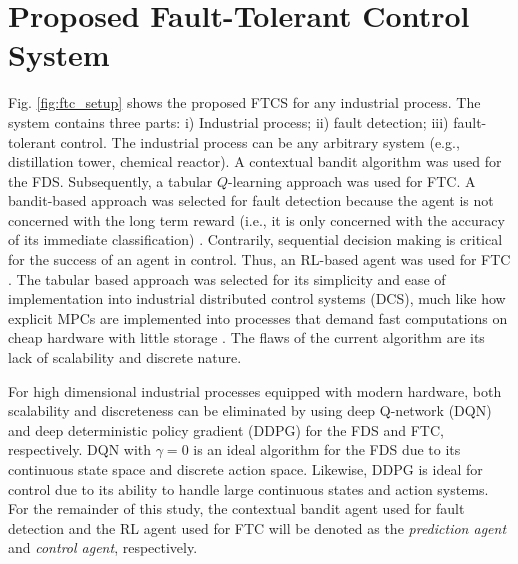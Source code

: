 \section{Proposed Fault-Tolerant Control System}

Fig. \ref{fig:ftc_setup} shows the proposed FTCS for any industrial process. The system contains three parts: i) Industrial process; ii) fault detection; iii) fault-tolerant control. The industrial process can be any arbitrary system (e.g., distillation tower, chemical reactor). A contextual bandit algorithm was used for the FDS. Subsequently, a tabular $Q$-learning approach was used for FTC. A bandit-based approach was selected for fault detection because the agent is not concerned with the long term reward (i.e., it is only concerned with the accuracy of its immediate classification) \cite{sutton}.  Contrarily, sequential decision making is critical for the success of an agent in control.  Thus, an RL-based agent was used for FTC \cite{bandits_ref9}. The tabular based approach was selected for its simplicity and ease of implementation into industrial distributed control systems (DCS), much like how explicit MPCs are implemented into processes that demand fast computations on cheap hardware with little storage \cite{explicit_MPC}. The flaws of the current algorithm are its lack of scalability and discrete nature.

For high dimensional industrial processes equipped with modern hardware, both scalability and discreteness can be eliminated by using deep Q-network (DQN) and deep deterministic policy gradient (DDPG) for the FDS and FTC, respectively.  DQN with $\gamma = 0$ is an ideal algorithm for the FDS due to its continuous state space and discrete action space. Likewise, DDPG is ideal for control due to its ability to handle large continuous states and action systems. For the remainder of this study, the contextual bandit agent used for fault detection and the RL agent used for FTC will be denoted as the \textit{prediction agent} and \textit{control agent}, respectively.

